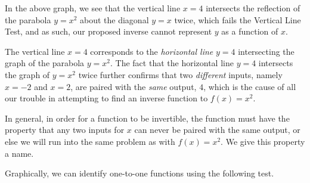 \documentclass[12pt]{book}
\theoremstyle{definition}
\begin{document}
In the above graph, we see that the vertical line $x=4$ intersects the reflection of the parabola $y=x^2$ about the diagonal $y=x$ twice, which fails the Vertical Line Test, and as such, our proposed inverse cannot represent $y$ as a function of $x$.\par
The vertical line $x=4$ corresponds to the {\it horizontal line} $y=4$ intersecting the graph of the parabola $y=x^2$.  The fact that the horizontal line $y=4$ intersects the graph of $y=x^2$ twice further confirms that two {\it different} inputs, namely $x=-2$ and $x=2$, are paired with the {\it same} output, $4$, which is the cause of all our trouble in attempting to find an inverse function to $f(x)=x^2$.\par
In general, in order for a function to be invertible, the function must have the property that any two inputs for $x$ can never be paired with the same output, or else we will run into the same problem as with $f(x) = x^2$.  We give this property a name.
\begin{center}
\end{center}
Graphically, we can identify one-to-one functions using the following test.
\begin{center}
\end{center}
\end{document}
